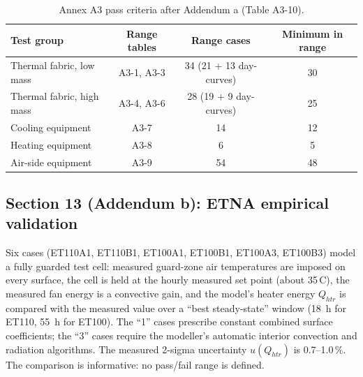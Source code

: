 \documentclass[10pt,a4paper]{article}
\begin{document}
\begin{table}[h]\centering\small
\caption{Annex A3 pass criteria after Addendum a (Table A3-10).}\label{tab:passcounts}
\begin{tabular}{lccc}\toprule
Test group & Range tables & Range cases & Minimum in range\\\midrule
Thermal fabric, low mass & A3-1, A3-3 & 34 (21 + 13 day-curves) & 30\\
Thermal fabric, high mass & A3-4, A3-6 & 28 (19 + 9 day-curves) & 25\\
Cooling equipment & A3-7 & 14 & 12\\
Heating equipment & A3-8 & 6 & 5\\
Air-side equipment & A3-9 & 54 & 48\\\bottomrule
\end{tabular}
\end{table}

\subsection{Section 13 (Addendum b): ETNA empirical validation}
Six cases (ET110A1, ET110B1, ET100A1, ET100B1, ET100A3, ET100B3) model a fully guarded test cell: measured
guard-zone air temperatures are imposed on every surface, the cell is held at the hourly measured set point
(about 35\,\textdegree C), the measured fan energy is a convective gain, and the model's heater energy $Q_{htr}$ is
compared with the measured value over a ``best steady-state'' window (18~h for ET110, 55~h for ET100). The ``1''
cases prescribe constant combined surface coefficients; the ``3'' cases require the modeller's automatic interior
convection and radiation algorithms. The measured 2-sigma uncertainty $u(Q_{htr})$ is 0.7--1.0\,\%. The comparison
is informative: no pass/fail range is defined.
\end{document}
